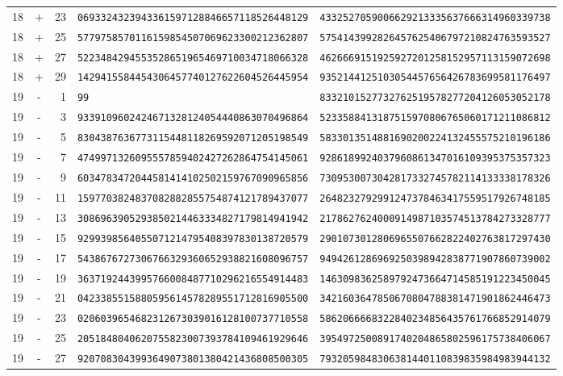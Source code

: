\begin{longtable}{@{}rcrll@{}}
18&+&23&\texttt{0693324323943361597128846657118526448129}&\texttt{4332527059006629213335637666314960339738}\\
18&+&25&\texttt{5779758570116159854507069623300212362807}&\texttt{5754143992826457625406797210824763593527}\\
18&+&27&\texttt{5223484294553528651965469710034718066328}&\texttt{4626669151925927201258152957113159072698}\\
18&+&29&\texttt{1429415584454306457740127622604526445954}&\texttt{9352144125103054457656426783699581176497}\\
19&-&1&\texttt{99}&\texttt{8332101527732762519578277204126053052178}\\
19&-&3&\texttt{9339109602424671328124054440863070496864}&\texttt{5233588413187515970806765060171211086812}\\
19&-&5&\texttt{8304387636773115448118269592071205198549}&\texttt{5833013514881690200224132455575210196186}\\
19&-&7&\texttt{4749971326095557859402427262864754145061}&\texttt{9286189924037960861347016109395375357323}\\
19&-&9&\texttt{6034783472044581414102502159767090965856}&\texttt{7309530073042817332745782114133338178326}\\
19&-&11&\texttt{1597703824837082882855754874121789437077}&\texttt{2648232792991247378463417559517926748185}\\
19&-&13&\texttt{3086963905293850214463334827179814941942}&\texttt{2178627624000914987103574513784273328777}\\
19&-&15&\texttt{9299398564055071214795408397830138720579}&\texttt{2901073012806965507662822402763817297430}\\
19&-&17&\texttt{5438676727306766329360652938821608096757}&\texttt{9494261286969250398942838771907860739002}\\
19&-&19&\texttt{3637192443995766008487710296216554914483}&\texttt{1463098362589792473664714585191223450045}\\
19&-&21&\texttt{0423385515880595614578289551712816905500}&\texttt{3421603647850670804788381471901862446473}\\
19&-&23&\texttt{0206039654682312673039016128100737710558}&\texttt{5862066668322840234856435761766852914079}\\
19&-&25&\texttt{2051848040620755823007393784109461929646}&\texttt{3954972500891740204865802596175738406067}\\
19&-&27&\texttt{9207083043993649073801380421436808500305}&\texttt{7932059848306381440110839835984983944132}\\

\end{longtable}
